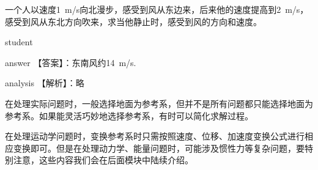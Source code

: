 \begin{example}
	一个人以速度\SI{1}{m/s}向北漫步，感受到风从东边来，后来他的速度提高到\SI{2}{m/s}，感受到风从东北方向吹来，求当他静止时，感受到风的方向和速度。
	
	\begin{taggedblock}{student}
		\vspace*{3cm}
	\end{taggedblock}
	
	
	\begin{taggedblock}{answer}
		【答案】：东南风约\SI{14}{m/s}.
	\end{taggedblock}
	
	\begin{taggedblock}{analysis}
		【解析】：略
	\end{taggedblock}
\end{example}


在处理实际问题时，一般选择地面为参考系，但并不是所有问题都只能选择地面为参考系。如果能灵活巧妙地选择参考系，有时可以简化求解过程。

在处理运动学问题时，变换参考系时只需按照速度、位移、加速度变换公式进行相应变换即可。但是在处理动力学、能量问题时，可能涉及惯性力等复杂问题，要特别注意，这些内容我们会在后面模块中陆续介绍。

